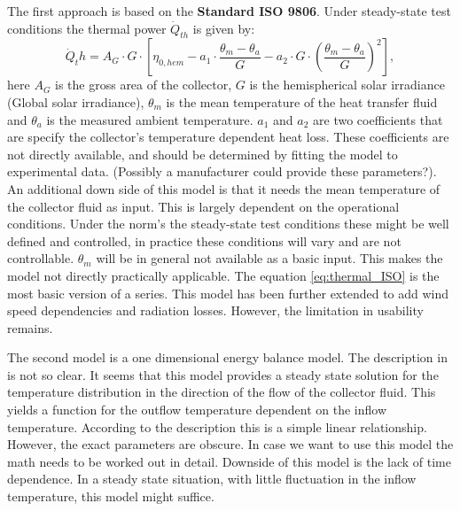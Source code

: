 The first approach is based on the \textbf{Standard ISO 9806}. Under steady-state test conditions the thermal power $\dot{Q}_{th}$ is given by:
\begin{equation}
\dot{Q}_th = A_G\cdot G\cdot \left[\eta_{0,hem} - a_1 \cdot \frac{\theta_m - \theta_a}{G} - a_2 \cdot G \cdot \left(\frac{\theta_m - \theta_a}{G}\right)^2 \right] ,
\label{eq:thermal_ISO}
\end{equation} 
here $A_G$ is the gross area of the collector,  $G$ is the hemispherical solar irradiance (Global solar irradiance), $\theta_m$ is the mean temperature of the heat transfer fluid and $\theta_a$ is the measured ambient temperature. $a_1$ and $a_2$ are two coefficients that are specify the collector's temperature dependent heat loss. These coefficients are not directly available, and should be determined by fitting the model to experimental data. (Possibly a manufacturer could provide these parameters?). An additional down side of this model is that it needs the mean temperature of the collector fluid as input. This is largely dependent on the operational conditions. Under the norm's  the steady-state test conditions these might be well defined and controlled, in practice these conditions will vary and are not controllable. $\theta_m$ will be in general not available as a basic input. This makes the model not directly practically applicable.  
The equation \ref{eq:thermal_ISO} is the most basic version of a series. This model has been further extended to add wind speed dependencies and radiation losses. However, the limitation in usability remains. 


The second model is a one dimensional energy balance model. The description in \cite{SHC2020PVT} is not so clear. It seems that this model provides a steady state solution for the temperature distribution in the direction of the flow of the collector fluid. This yields a function for the outflow temperature dependent on the inflow temperature. According to the description this is a simple linear relationship. However, the exact parameters are obscure. In case we want to use this model the math needs to be worked out in detail. Downside of this model is the lack of time dependence. In a steady state situation, with little fluctuation in the inflow temperature, this model might suffice. 

 




